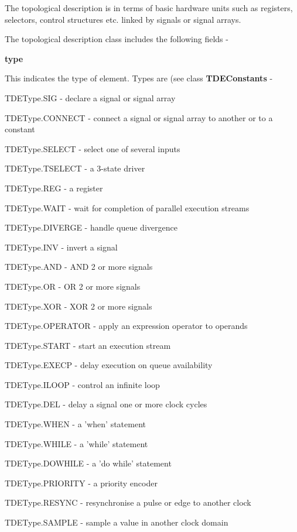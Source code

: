 The topological description is in terms of basic
hardware units such as registers, selectors,
control structures etc. linked by signals or signal
arrays.

The topological description class includes the following
fields -

{\bf type}

This indicates the type of element. Types are (see class
{\bf TDEConstants} -
\blist
\item   TDEType.SIG -       declare a signal or signal array
\item   TDEType.CONNECT -   connect a signal or signal array to another or to a
                            constant
\item   TDEType.SELECT -    select one of several inputs
\item   TDEType.TSELECT -   a 3-state driver
\item   TDEType.REG -       a register
\item   TDEType.WAIT -      wait for completion of parallel execution streams
\item   TDEType.DIVERGE -   handle queue divergence
\item   TDEType.INV -       invert a signal
\item   TDEType.AND -       AND 2 or more signals
\item   TDEType.OR -        OR 2 or more signals
\item   TDEType.XOR -       XOR 2 or more signals
\item   TDEType.OPERATOR -  apply an expression operator to operands
\item   TDEType.START -     start an execution stream
\item   TDEType.EXECP -     delay execution on queue availability
\item   TDEType.ILOOP -     control an infinite loop
\item   TDEType.DEL -       delay a signal one or more clock cycles
\item   TDEType.WHEN -      a 'when' statement
\item   TDEType.WHILE -     a 'while' statement
\item   TDEType.DOWHILE -   a 'do while' statement
\item   TDEType.PRIORITY -  a priority encoder
\item   TDEType.RESYNC -    resynchronise a pulse or edge to another clock
\item   TDEType.SAMPLE -    sample a value in another clock domain
